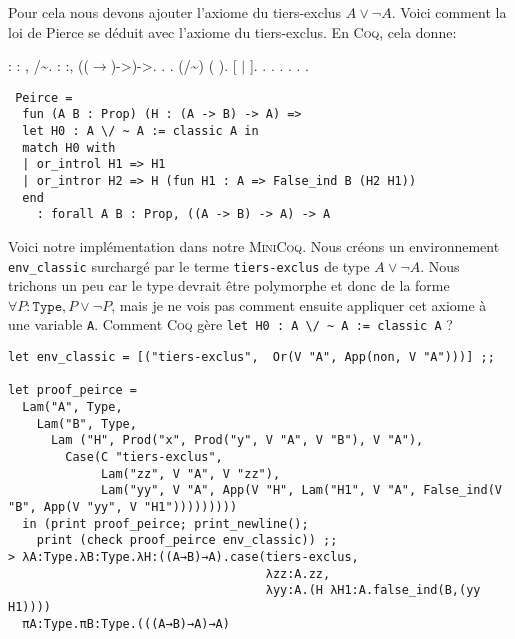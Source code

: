 Pour cela nous devons ajouter l'axiome du tiers-exclus $A \vee \neg A$. 
Voici comment la loi de Pierce se déduit avec l'axiome du tiers-exclus. En \textsc{Coq}, cela donne:

\begin{coqdoccode}
\coqdocnoindent
{} : \coqdockw{\ensuremath{\forall}} : , /\~{}.\coqdoceol
\coqdocnoindent
{}  : \coqdockw{\ensuremath{\forall}}  :, ((\ensuremath{\rightarrow})->)->.\coqdoceol
\coqdocnoindent
{}.\coqdoceol
\coqdocindent{1.00em}
.\coqdoceol
\coqdocindent{1.00em}
 (/\~{})  (  ).\coqdoceol
\coqdocindent{1.00em}
   [ \ensuremath{|} ].\coqdoceol
\coqdocindent{1.00em}
 .\coqdoceol
\coqdocindent{1.00em}
  .\coqdoceol
\coqdocindent{1.00em}
.\coqdoceol
\coqdocindent{1.00em}
.\coqdoceol
\coqdocnoindent
{}.\coqdoceol
\coqdocemptyline
\coqdocnoindent
{} .\coqdoceol
\end{coqdoccode}

\begin{Verbatim}
 Peirce = 
  fun (A B : Prop) (H : (A -> B) -> A) =>
  let H0 : A \/ ~ A := classic A in
  match H0 with
  | or_introl H1 => H1
  | or_intror H2 => H (fun H1 : A => False_ind B (H2 H1))
  end
    : forall A B : Prop, ((A -> B) -> A) -> A
\end{Verbatim}

Voici notre implémentation dans notre \textsc{MiniCoq}. 
Nous créons un environnement \verb+env_classic+ surchargé par le terme \verb+tiers-exclus+ de type $A \vee \neg A$.
Nous trichons un peu car le type devrait être polymorphe et donc de la forme $\forall P:\mathtt{Type}, P \vee \neg P$, mais 
je ne vois pas comment ensuite appliquer cet axiome à une variable \verb+A+. Comment \textsc{Coq} gère \verb+let H0 : A \/ ~ A := classic A+ ? 

\begin{Verbatim}
let env_classic = [("tiers-exclus",  Or(V "A", App(non, V "A")))] ;;

let proof_peirce = 
  Lam("A", Type,
    Lam("B", Type, 
      Lam ("H", Prod("x", Prod("y", V "A", V "B"), V "A"),
        Case(C "tiers-exclus",
             Lam("zz", V "A", V "zz"),
             Lam("yy", V "A", App(V "H", Lam("H1", V "A", False_ind(V "B", App(V "yy", V "H1")))))))))
  in (print proof_peirce; print_newline();
    print (check proof_peirce env_classic)) ;;
> λA:Type.λB:Type.λH:((A→B)→A).case(tiers-exclus,
                                    λzz:A.zz,
                                    λyy:A.(H λH1:A.false_ind(B,(yy H1))))
  πA:Type.πB:Type.(((A→B)→A)→A)
\end{Verbatim}

